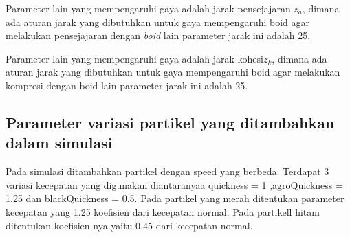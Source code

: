 Parameter lain yang mempengaruhi gaya adalah jarak pensejajaran $z_a$, dimana ada aturan jarak yang dibutuhkan untuk gaya mempengaruhi boid agar melakukan pensejajaran dengan \emph{boid} lain parameter jarak ini adalah 25.

Parameter lain yang mempengaruhi gaya adalah jarak kohesi$z_k$, dimana ada aturan jarak yang dibutuhkan untuk gaya mempengaruhi boid agar melakukan kompresi dengan boid lain parameter jarak ini adalah 25.
\subsection{Parameter variasi partikel yang ditambahkan dalam simulasi}
Pada simulasi ditambahkan partikel dengan speed yang berbeda. Terdapat 3 variasi kecepatan yang digunakan diantaranyaa quickness = 1 ,agroQuickness = 1.25 dan blackQuickness = 0.5. Pada partikel yang merah ditentukan parameter kecepatan yang 1.25 koefisien dari kecepatan normal. Pada partikell hitam ditentukan koefisien nya yaitu 0.45 dari kecepatan normal.




%